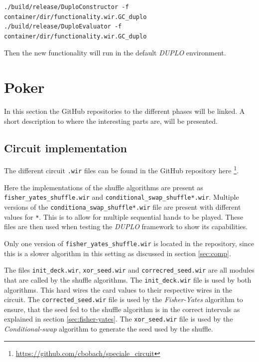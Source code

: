 \documentclass[twoside,11pt,openright]{report}
\newcommand{\FY}{\textit{Fisher-Yates} }
\newcommand{\CS}{\textit{Conditional-swap} }
\newcommand{\DUPLO}{\textit{DUPLO} }
\begin{document}
\begin{appendices}
\begin{center}
\begin{verbatim}
./build/release/DuploConstructor -f container/dir/functionality.wir.GC_duplo
./build/release/DuploEvaluator -f container/dir/functionality.wir.GC_duplo
\end{verbatim}
\end{center}

Then the new functionality will run in the default \DUPLO environment.

\section{Poker}
\label{app:poker}
In this section the GitHub repositories to the different phases will be linked. A short description to where the interesting parts are, will be presented.

\subsection{Circuit implementation}
\label{app:circuit-impl}
The different circuit \verb|.wir| files can be found in the GitHub repository here \footnote{\url{https://github.com/cbobach/speciale_circuit}}.

Here the implementations of the shuffle algorithms are present as \verb|fisher_yates_shuffle.wir| and \verb|conditional_swap_shuffle*.wir|. Multiple versions of the \verb|conditiona_swap_shuffle*.wir| file are present with different values for \verb|*|. This is to allow for multiple sequential hands to be played. These files are then used when testing the \DUPLO framework to show its capabilities.

Only one version of \verb|fisher_yates_shuffle.wir| is located in the repository, since this is a slower algorithm in this setting as discussed in section \ref{sec:comp}.

The files \verb|init_deck.wir|, \verb|xor_seed.wir| and \verb|correcred_seed.wir| are all modules that are called by the shuffle algorithms. The \verb|init_deck.wir| file is used by both algorithms. This hard wires the card values to their respective wires in the circuit. The \verb|corrected_seed.wir| file is used by the \FY algorithm to ensure, that the seed fed to the shuffle algorithm is in the correct intervals as explained in section \ref{sec:fisher-yates}. The \verb|xor_seed.wir| file is used by the \CS algorithm to generate the seed used by the shuffle.

\bigskip


\end{appendices}
\end{document}
